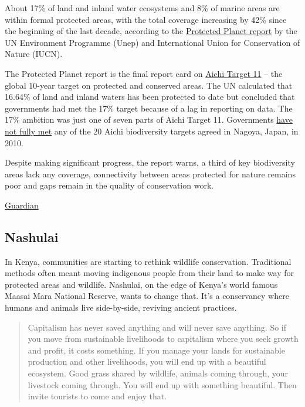 \documentclass[
]{book}
\begin{document}
About 17\% of land and inland water ecosystems and 8\% of marine areas are within formal protected areas, with the total coverage increasing by 42\% since the beginning of the last decade, according to the \href{https://livereport.protectedplanet.net/}{Protected Planet report} by the UN Environment Programme (Unep) and International Union for Conservation of Nature (IUCN).

The Protected Planet report is the final report card on \href{http://url3193.iucn-crm.org/ls/click}{Aichi Target 11} -- the global 10-year target on protected and conserved areas. The UN calculated that 16.64\% of land and inland waters has been protected to date but concluded that governments had met the 17\% target because of a lag in reporting on data. The 17\% ambition was just one of seven parts of Aichi Target 11. Governments \href{https://www.theguardian.com/environment/2020/sep/15/every-global-target-to-stem-destruction-of-nature-by-2020-missed-un-report-aoe}{have not fully met} any of the 20 Aichi biodiversity targets agreed in Nagoya, Japan, in 2010.

Despite making significant progress, the report warns, a third of key biodiversity areas lack any coverage, connectivity between areas protected for nature remains poor and gaps remain in the quality of conservation work.

\href{https://www.theguardian.com/environment/2021/may/19/governments-achieve-10-year-target-of-protecting-17-percent-land-aoe}{Guardian}

\hypertarget{nashulai}{%
\subsection{Nashulai}\label{nashulai}}

In Kenya, communities are starting to rethink wildlife conservation. Traditional methods often meant moving indigenous people from their land to make way for protected areas and wildlife.
Nashulai, on the edge of Kenya's world famous Maasai Mara National Reserve, wants to change that. It's a conservancy where humans and animals live side-by-side, reviving ancient practices.

\begin{quote}
Capitalism has never saved anything and will never save anything.
So if you move from sustainable livelihoods to capitalism where you seek growth and profit,
it costs something. If you manage your lands for sustainable production and other livelihoods,
you will end up with a beautiful ecosystem. Good grass shared by wildlife,
animals coming through, your livestock coming through.
You will end up with something beautiful.
Then invite tourists to come and enjoy that.
\end{quote}
\end{document}
